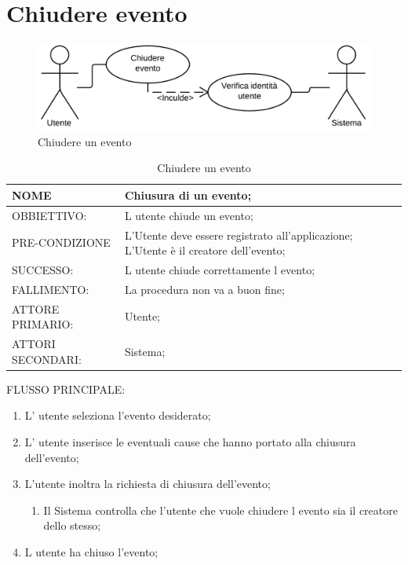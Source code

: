 \section{Chiudere evento}
\begin{figure}[H]
\centering
\includegraphics[scale=0.30]{img/use/Chiude.png}
\caption{Chiudere un evento}
\label{fig:Chiudere}
\end{figure}
\begin{table}[H]
\begin{tabular}{p{}|p{}}
\toprule
NOME & Chiusura di un evento;\\
\hline
OBBIETTIVO: & L utente chiude un evento;\\
\hline
PRE-CONDIZIONE & L'Utente deve essere registrato all'applicazione;
L'Utente è il creatore dell'evento;\\
\hline
SUCCESSO: & L utente chiude correttamente l evento;\\
\hline
FALLIMENTO: & La procedura non va a buon fine;\\
\hline
ATTORE PRIMARIO: & Utente;\\
\hline
ATTORI SECONDARI: & Sistema;\\
\bottomrule
\end{tabular}
\caption{Chiudere un evento}
\label{table:chiude}
\end{table}	
FLUSSO PRINCIPALE:
\begin{enumerate}
\item L' utente seleziona l'evento desiderato;
\item L' utente inserisce le eventuali cause che hanno portato alla chiusura dell'evento;
\item L'utente inoltra la richiesta di chiusura dell'evento;
\begin{enumerate}
\item Il Sistema controlla che l'utente che vuole chiudere l evento sia il creatore dello stesso;
\end{enumerate}
\item L utente ha chiuso l'evento;
\end{enumerate}

